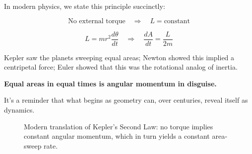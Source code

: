In modern physics, we state this principle succinctly:

\[
\text{No external torque} \quad \Rightarrow \quad L = \text{constant}
\]

\[
L = m r^2 \frac{d\theta}{dt}
\quad \Rightarrow \quad
\frac{dA}{dt} = \frac{L}{2m}
\]

Kepler saw the planets sweeping equal areas; Newton showed this implied a centripetal force; Euler showed that 
this was the rotational analog of inertia.

\textbf{Equal areas in equal times is angular momentum in disguise.}

It’s a reminder that what begins as geometry can, over centuries, reveal itself as dynamics.



\begin{figure}[H]
    \centering
    \caption{Modern translation of Kepler’s Second Law: no torque implies constant angular momentum, which in turn yields a constant area‐sweep rate.}
    \label{fig:modern-translation-kepler}
\end{figure}
